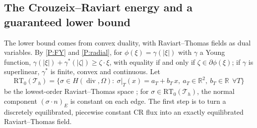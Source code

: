 \documentclass[11pt]{amsart}
\theoremstyle{definition}
\theoremstyle{remark}
\numberwithin{equation}{section}
\newcommand{\R}{\mathbb{R}}
\newcommand{\abs}[1]{\lvert #1\rvert}
\newcommand{\RT}{\mathrm{RT}_0}
\newcommand{\Th}{\mathcal T_h}
\DeclareMathOperator{\divg}{div}
\begin{document}
\subsection{The Crouzeix--Raviart energy and a guaranteed lower bound}\label{ssec:bounds}
The lower bound comes from convex duality, with Raviart--Thomas fields as dual variables. By \ref{P:FY} and \ref{P:radial}, for $\phi(\xi)=\gamma(\abs\xi)$ with $\gamma$ a Young function, $\gamma(\abs\xi)+\gamma^*(\abs\zeta)\ge\zeta\cdot\xi$, with equality if and only if $\zeta\in\partial\phi(\xi)$; if $\gamma$ is superlinear, $\gamma^*$ is finite, convex and continuous. Let
\[
\RT(\Th)=\{\sigma\in H(\divg,\Omega):\ \sigma|_T(x)=a_T+b_T\,x,\ a_T\in\R^2,\ b_T\in\R\ \ \forall T\}
\]
be the lowest-order Raviart--Thomas space \cite{RaviartThomas1977}; for $\sigma\in\RT(\Th)$, the normal component $(\sigma\cdot n)_E$ is constant on each edge. The first step is to turn a discretely equilibrated, piecewise constant CR flux into an exactly equilibrated Raviart--Thomas field.
\end{document}
